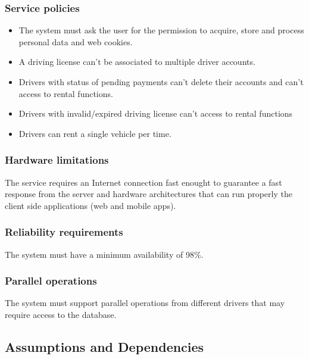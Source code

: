 \subsubsection{Service policies}
\begin{itemize}
	\item The system must ask the user for the permission to acquire, store and process personal data and web cookies.
	\item A driving license can't be associated to multiple driver accounts.
	\item Drivers with status of pending payments can't delete their accounts and can't access to rental functions.
	\item Drivers with invalid/expired driving license can't access to rental functions
	\item Drivers can rent a single vehicle per time.
\end{itemize}	

\subsubsection{Hardware limitations}
The service requires an Internet connection fast enought to guarantee a fast response from the server and hardware architectures that can run properly the client side applications (web and mobile apps).

\subsubsection{Reliability requirements}
The system must have a minimum availability of 98\%.

\subsubsection{Parallel operations}
The system must support parallel operations from different drivers that may require access to the database.

\subsection{Assumptions and Dependencies}

